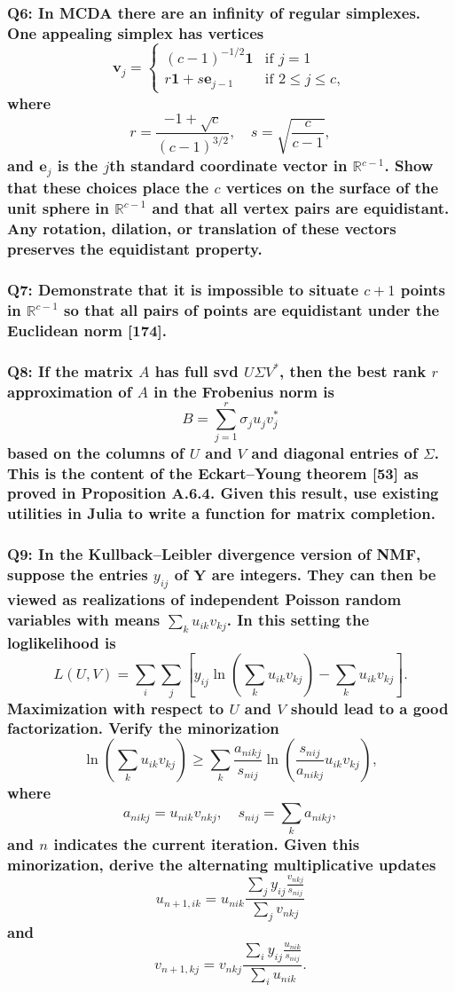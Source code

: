 \documentclass{article}
\begin{document}
\subsubsection*{Q6: In MCDA there are an infinity of regular simplexes. One appealing simplex has vertices
\[
\mathbf{v}_j = 
\begin{cases} 
(c - 1)^{-1/2} \mathbf{1} & \text{if } j = 1 \\ 
r \mathbf{1} + s \mathbf{e}_{j-1} & \text{if } 2 \leq j \leq c, 
\end{cases}
\]
where
\[
r = \frac{-1 + \sqrt{c}}{(c - 1)^{3/2}}, \quad s = \sqrt{\frac{c}{c - 1}},
\]
and \(\mathbf{e}_j\) is the \(j\)th standard coordinate vector in \(\mathbb{R}^{c-1}\). Show that these choices place the \(c\) vertices on the surface of the unit sphere in \(\mathbb{R}^{c-1}\) and that all vertex pairs are equidistant. Any rotation, dilation, or translation of these vectors preserves the equidistant property.}

\subsubsection*{Q7: Demonstrate that it is impossible to situate \(c + 1\) points in \(\mathbb{R}^{c-1}\) so that all pairs of points are equidistant under the Euclidean norm [174].}

\subsubsection*{Q8: If the matrix \(A\) has full svd \(U \Sigma V^*\), then the best rank \(r\) approximation of \(A\) in the Frobenius norm is
\[
B = \sum_{j=1}^r \sigma_j u_j v_j^*
\]
based on the columns of \(U\) and \(V\) and diagonal entries of \(\Sigma\). This is the content of the Eckart–Young theorem [53] as proved in Proposition A.6.4. Given this result, use existing utilities in Julia to write a function for matrix completion.}

\subsubsection*{Q9: In the Kullback–Leibler divergence version of NMF, suppose the entries \(y_{ij}\) of \(\mathbf{Y}\) are integers. They can then be viewed as realizations of independent Poisson random variables with means \(\sum_k u_{ik}v_{kj}\). In this setting the loglikelihood is
\[
L(U, V) = \sum_i \sum_j \left[ y_{ij} \ln \left( \sum_k u_{ik}v_{kj} \right) - \sum_k u_{ik}v_{kj} \right].
\]
\noindent Maximization with respect to \(U\) and \(V\) should lead to a good factorization. Verify the minorization
\[
\ln \left( \sum_k u_{ik}v_{kj} \right) \geq \sum_k \frac{a_{nikj}}{s_{nij}} \ln \left( \frac{s_{nij}}{a_{nikj}} u_{ik}v_{kj} \right),
\]
\noindent where
\[
a_{nikj} = u_{nik}v_{nkj}, \quad s_{nij} = \sum_k a_{nikj},
\]
\noindent and \(n\) indicates the current iteration. Given this minorization, derive the alternating multiplicative updates
\[
u_{n+1,ik} = u_{nik} \frac{\sum_j y_{ij} \frac{v_{nkj}}{s_{nij}}}{\sum_j v_{nkj}}
\]
\noindent and
\[
v_{n+1,kj} = v_{nkj} \frac{\sum_i y_{ij} \frac{u_{nik}}{s_{nij}}}{\sum_i u_{nik}}.
\]}
\end{document}
